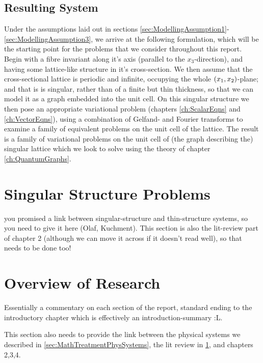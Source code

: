 \subsection{Resulting System} \label{sec:OurSystem}
Under the assumptions laid out in sections \ref{sec:ModellingAssumption1}-\ref{sec:ModellingAssumption3}, we arrive at the following formulation, which will be the starting point for the problems that we consider throughout this report.
Begin with a fibre invariant along it's axis (parallel to the $x_3$-direction), and having some lattice-like structure in it's cross-section.
We then assume that the cross-sectional lattice is periodic and infinite, occupying the whole $\left( x_1,x_2 \right)$-plane; and that is is singular, rather than of a finite but thin thickness, so that we can model it as a graph embedded into the unit cell.
On this singular structure we then pose an appropriate variational problem (chapters \ref{ch:ScalarEqns} and \ref{ch:VectorEqns}), using a combination of Gelfand- and Fourier transforms to examine a family of equivalent problems on the unit cell of the lattice.
The result is a family of variational problems on the unit cell of (the graph describing the) singular lattice which we look to solve using the theory of chapter \ref{ch:QuantumGraphs}.

\section{Singular Structure Problems} \label{sec:GraphLitReview}
you promised a link between singular-structure and thin-structure systems, so you need to give it here (Olaf, Kuchment).
This section is also the lit-review part of chapter 2 (although we can move it across if it doesn't read well), so that needs to be done too!

\section{Overview of Research} \label{sec:ReportOverview}
Essentially a commentary on each section of the report, standard ending to the introductory chapter which is effectively an introduction-summary :L.

This section also needs to provide the link between the physical systems we described in \ref{sec:MathTreatmentPhysSystems}, the lit review in \ref{sec:GraphLitReview}, and chapters 2,3,4.